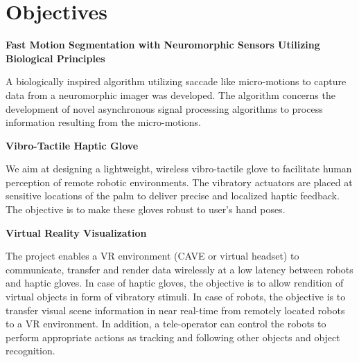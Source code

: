 \chapter{Objectives}\label{ch:introduction}



{\bf Fast Motion Segmentation with Neuromorphic Sensors Utilizing
  Biological Principles}


A biologically inspired algorithm utilizing saccade like micro-motions
to capture data from a neuromorphic imager was developed. The
algorithm concerns the development of novel asynchronous signal
processing algorithms to process information resulting from the
micro-motions.

\vspace{4mm}

\noindent
{\bf Vibro-Tactile Haptic Glove}


We aim at designing a lightweight, wireless vibro-tactile glove to facilitate human perception of remote robotic environments. The vibratory actuators are placed at sensitive locations of the palm to deliver precise and localized haptic feedback. The objective is to make these gloves robust to user’s hand poses.

\vspace{4mm}

\noindent
{\bf Virtual Reality Visualization}

The project enables a VR environment (CAVE or virtual headset) to
communicate, transfer and render data wirelessly at a low latency
between robots and haptic gloves. In case of haptic gloves, the
objective is to allow rendition of virtual objects in form of
vibratory stimuli. In case of robots, the objective is to transfer
visual scene information in near real-time from remotely located
robots to a VR environment. In addition, a tele-operator can control
the robots to perform appropriate actions as tracking and following
other objects and object recognition.

